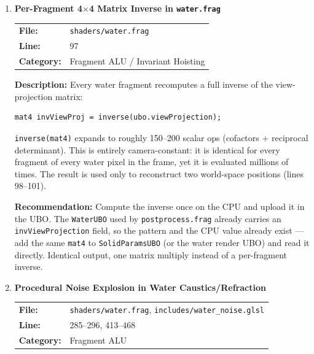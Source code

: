 \documentclass[a4paper,12pt]{article}
\newcommand{\severitybox}[2]{%
  \colorbox{#1}{\makebox[2.5cm][c]{\textcolor{white}{\textbf{#2}}}}%
}
\begin{document}
\begin{enumerate}[leftmargin=*]

\item[\textbf{[SH1]}] \textbf{Per-Fragment 4$\times$4 Matrix Inverse in \texttt{water.frag}}
  \hfill \severitybox{highcolor}{HIGH}

  \begin{tabular}{ll}
    \textbf{File:} & \texttt{shaders/water.frag} \\
    \textbf{Line:} & 97 \\
    \textbf{Category:} & Fragment ALU / Invariant Hoisting \\
  \end{tabular}

  \textbf{Description:}
  Every water fragment recomputes a full inverse of the view-projection matrix:

\begin{lstlisting}
mat4 invViewProj = inverse(ubo.viewProjection);
\end{lstlisting}

  \texttt{inverse(mat4)} expands to roughly 150--200 scalar ops (cofactors +
  reciprocal determinant). This is entirely camera-constant: it is identical for
  every fragment of every water pixel in the frame, yet it is evaluated
  millions of times. The result is used only to reconstruct two world-space
  positions (lines 98--101).

  \textbf{Recommendation:}
  Compute the inverse once on the CPU and upload it in the UBO. The
  \texttt{WaterUBO} used by \texttt{postprocess.frag} already carries an
  \texttt{invViewProjection} field, so the pattern and the CPU value already
  exist — add the same \texttt{mat4} to \texttt{SolidParamsUBO} (or the water
  render UBO) and read it directly. Identical output, one matrix multiply
  instead of a per-fragment inverse.

\item[\textbf{[SH2]}] \textbf{Procedural Noise Explosion in Water Caustics/Refraction}
  \hfill \severitybox{highcolor}{HIGH}

  \begin{tabular}{ll}
    \textbf{File:} & \texttt{shaders/water.frag}, \texttt{includes/water\_noise.glsl} \\
    \textbf{Line:} & 285--296, 413--468 \\
    \textbf{Category:} & Fragment ALU \\
  \end{tabular}


\end{enumerate}
\end{document}
